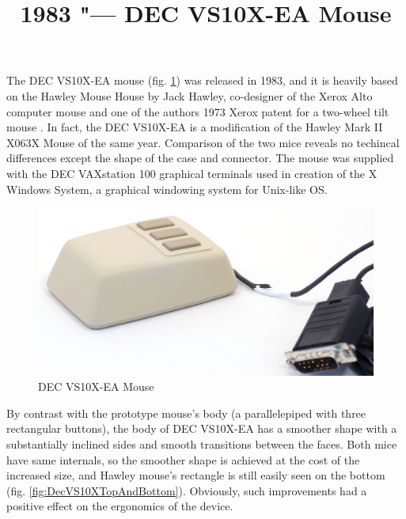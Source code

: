 \documentclass[11pt, a4paper]{article}
\begin{document}
\title{1983 "--- DEC VS10X-EA Mouse}
\date{}
\maketitle
{}
The DEC VS10X-EA mouse (fig. \ref{fig:DecVS10XPic}) was released in 1983, and it is heavily based on the Hawley Mouse House \cite{hawley,mouses} by Jack Hawley, co-designer of the Xerox Alto computer mouse and one of the authors 1973 Xerox patent for a two-wheel tilt mouse \cite{pat}. In fact, the DEC VS10X-EA is a modification of the Hawley Mark II X063X Mouse of the same year. Comparison of the two mice reveals no techincal differences except the shape of the case and connector. The mouse was supplied with the DEC VAXstation 100 graphical terminals \cite{reddit} used in creation of the X Windows System, a graphical windowing system for Unix-like OS.

\begin{figure}[h]
   \centering
    \includegraphics[scale=0.6]{1983_dec_vs10x_ea_mouse/pic_30.jpg}
    \caption{DEC VS10X-EA Mouse}
    \label{fig:DecVS10XPic}
\end{figure}

By contrast with the prototype mouse’s body (a parallelepiped with three rectangular buttons), the body of DEC VS10X-EA has a smoother shape with a substantially inclined sides and smooth transitions between the faces. Both mice have same internals, so the smoother shape is achieved at the cost of the increased size, and Hawley mouse’s rectangle is still easily seen on the bottom (fig. \ref{fig:DecVS10XTopAndBottom}). Obviously, such improvements had a positive effect on the ergonomics of the device.
\end{document}
